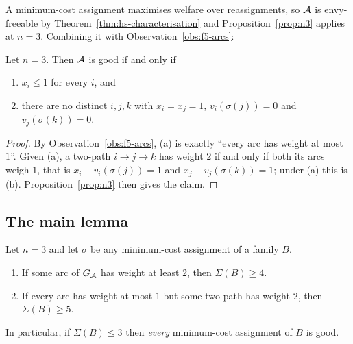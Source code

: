 A minimum-cost assignment maximises welfare over reassignments, so
$\mathcal{A}$ is envy-freeable by Theorem~\ref{thm:hs-characterisation} and
Proposition~\ref{prop:n3} applies at $n = 3$. Combining it with
Observation~\ref{obs:f5-arcs}:

\begin{proposition}[Criterion at $n = 3$]
\label{prop:f5-n3crit}
Let $n = 3$. Then $\mathcal{A}$ is good if and only if
\begin{enumerate}
  \item[(a)] $x_i \le 1$ for every $i$, and
  \item[(b)] there are no distinct $i,j,k$ with $x_i = x_j = 1$,
    $v_i(\sigma(j)) = 0$ and $v_j(\sigma(k)) = 0$.
\end{enumerate}
\end{proposition}

\begin{proof}
By Observation~\ref{obs:f5-arcs}, (a) is exactly ``every arc has weight at most
$1$''. Given (a), a two-path $i \to j \to k$ has weight $2$ if and only if both
its arcs weigh $1$, that is $x_i - v_i(\sigma(j)) = 1$ and
$x_j - v_j(\sigma(k)) = 1$; under (a) this is (b). Proposition~\ref{prop:n3}
then gives the claim.
\end{proof}

\subsection{The main lemma}
\label{sec:f5-main}

\begin{theorem}
\label{thm:f5-sigma3}
Let $n = 3$ and let $\sigma$ be any minimum-cost assignment of a family $B$.
\begin{enumerate}
  \item[(i)] If some arc of $G_{\mathcal{A}}$ has weight at least $2$, then
    $\Sigma(B) \ge 4$.
  \item[(ii)] If every arc has weight at most $1$ but some two-path has weight
    $2$, then $\Sigma(B) \ge 5$.
\end{enumerate}
In particular, if $\Sigma(B) \le 3$ then \emph{every} minimum-cost assignment of
$B$ is good.
\end{theorem}

